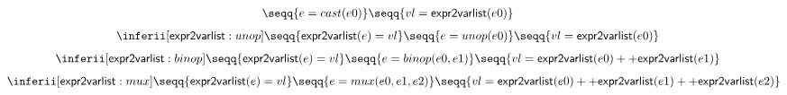 {\begin{table}[htbp]
\begin{gather*}
    {\seqq{e = cast(e0)}}
    {\seqq{vl = {\sf expr2varlist}(e0)}}
   \quad
   \\[1ex]
    \inferii[{\sf expr2varlist}: unop]
    {\seqq{{\sf expr2varlist}(e) = vl}}
    {\seqq{e = unop(e0)}}
    {\seqq{vl = {\sf expr2varlist}(e0)}}
   \quad
   \\[1ex]
    \inferii[{\sf expr2varlist}: binop]
    {\seqq{{\sf expr2varlist}(e) = vl}}
    {\seqq{e = binop(e0, e1)}}
    {\seqq{vl = {\sf expr2varlist}(e0) ++ {\sf expr2varlist}(e1)}}
    \quad
   \\[1ex]
    \inferii[{\sf expr2varlist}: mux]
    {\seqq{{\sf expr2varlist}(e) = vl}}
    {\seqq{e = mux(e0, e1, e2)}}
    {\seqq{vl = {\sf expr2varlist}(e0) ++ {\sf expr2varlist}(e1) ++ {\sf expr2varlist}(e2)}}
  \end{gather*}
  \caption{${\sf drawG}$, ${\sf drawEl}$, and ${\sf expr2varlist}$}
  \label{tab:ports-stmts-tmap}
  \vspace{-6mm}
\end{table}
}
